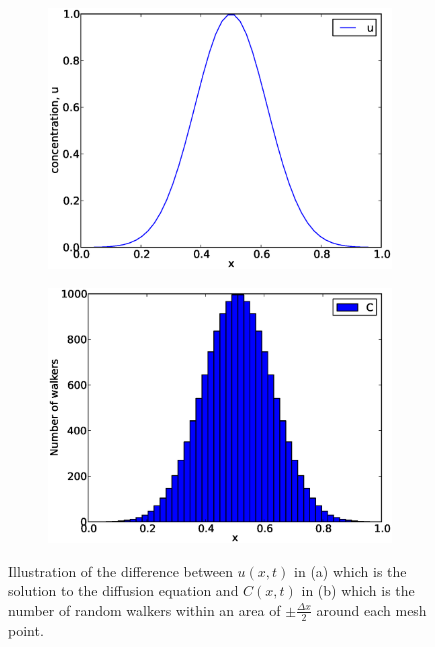 \begin{figure}[H]
 \centering
 \begin{subfigure}{0.48\textwidth}
  \includegraphics[width=\textwidth]{Figures/illustration_C_pt1.eps}
  \caption{}
 \end{subfigure}
 \begin{subfigure}{0.48\textwidth}
  \includegraphics[width=\textwidth]{Figures/illustration_C_pt2.eps}
  \caption{}
 \end{subfigure}
 \caption[Illustration of $C(x)$]{Illustration of the difference between $u(x,t)$ in (a) which is the solution to the diffusion equation and $C(x,t)$ in (b) which is the number of random walkers within an area of $\pm\frac{\Delta x}{2}$ around each mesh point.}
 \label{theory:illustration_C}
\end{figure}



